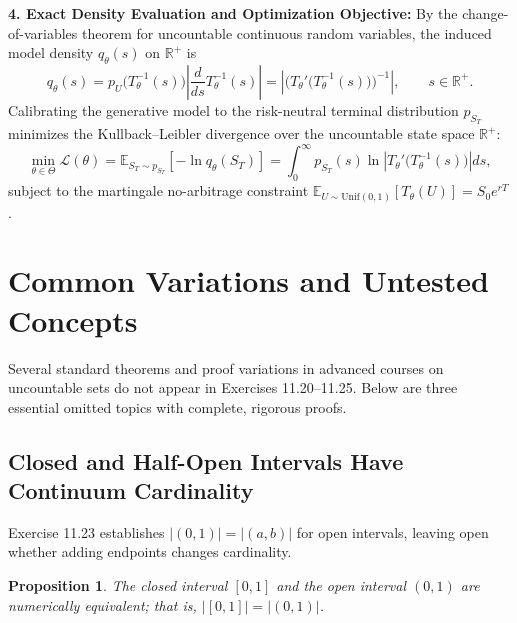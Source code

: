 \documentclass[11pt, letterpaper]{article}
\newtheorem{proposition}[theorem]{Proposition}
\theoremstyle{definition}
\theoremstyle{remark}
\begin{document}
\textbf{4. Exact Density Evaluation and Optimization Objective:}
By the change-of-variables theorem for uncountable continuous random variables, the induced model density $q_\theta(s)$ on $\mathbb{R}^+$ is
\[
q_\theta(s) = p_U\!\big(T_\theta^{-1}(s)\big) \left|\frac{d}{ds} T_\theta^{-1}(s)\right| = \left|\big(T_\theta'\big(T_\theta^{-1}(s)\big)\big)^{-1}\right|, \qquad s \in \mathbb{R}^+.
\]
Calibrating the generative model to the risk-neutral terminal distribution $p_{S_T}$ minimizes the Kullback--Leibler divergence over the uncountable state space $\mathbb{R}^+$:
\[
\min_{\theta \in \Theta} \mathcal{L}(\theta) = \mathbb{E}_{S_T \sim p_{S_T}}\!\left[-\ln q_\theta(S_T)\right] = \int_{0}^{\infty} p_{S_T}(s) \ln\!\left|T_\theta'\!\big(T_\theta^{-1}(s)\big)\right| ds,
\]
subject to the martingale no-arbitrage constraint $\mathbb{E}_{U \sim \mathrm{Unif}(0,1)}[T_\theta(U)] = S_0 e^{rT}$.

\section{Common Variations and Untested Concepts}

Several standard theorems and proof variations in advanced courses on uncountable sets do not appear in Exercises 11.20--11.25. Below are three essential omitted topics with complete, rigorous proofs.

\subsection{Closed and Half-Open Intervals Have Continuum Cardinality}

Exercise 11.23 establishes $|(0, 1)| = |(a, b)|$ for open intervals, leaving open whether adding endpoints changes cardinality.

\begin{proposition}
The closed interval $[0, 1]$ and the open interval $(0, 1)$ are numerically equivalent; that is, $|[0, 1]| = |(0, 1)|$.
\end{proposition}
\end{document}
